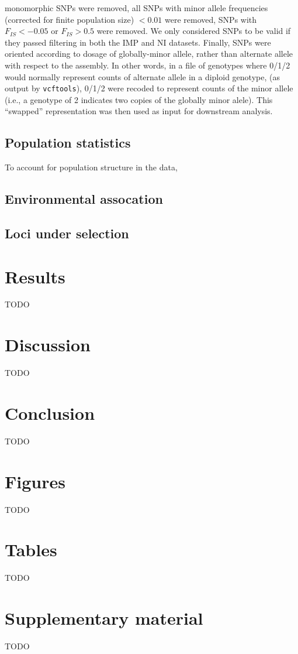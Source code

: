 \documentclass[fleqn,11pt]{wlpeerj}
\begin{document}
monomorphic SNPs were removed, all SNPs with minor allele frequencies (corrected
for finite population size) $< 0.01$ were removed, SNPs with $F_{IS} < -0.05$ or
$F_{IS} > 0.5$ were removed.  We only considered SNPs to be valid if they passed
filtering in both the IMP and NI datasets. Finally, SNPs were oriented according
to dosage of globally-minor allele, rather than alternate allele with respect to
the assembly. In other words, in a file of genotypes where 0/1/2 would normally
represent counts of alternate allele in a diploid genotype,  (as output by
\texttt{vcftools}), 0/1/2 were recoded to represent counts of the minor allele
(i.e., a genotype of 2 indicates two copies of the globally minor alele). This
``swapped'' representation was then used as input for downstream analysis.


\subsection*{Population statistics}
To account for population structure in the data,


\subsection*{Environmental assocation}

\subsection*{Loci under selection}


\subsection*{}

\section*{Results}
TODO


\section*{Discussion}
TODO


\section*{Conclusion}
TODO


\section*{Figures}
TODO

\section*{Tables}
TODO

\section*{Supplementary material}
TODO

\clearpage

\end{document}
